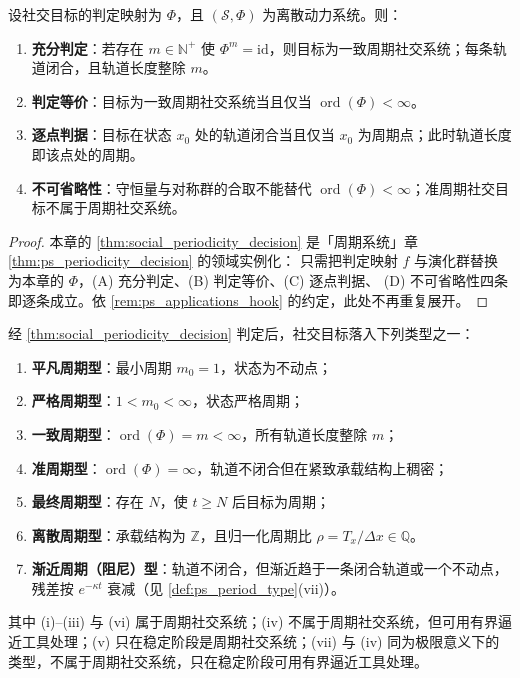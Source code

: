 \begin{theorem}[社交周期性判定定理]\label{thm:social_periodicity_decision}
设社交目标的判定映射为 $\Phi$，且 $(\mathcal S,\Phi)$ 为离散动力系统。则：
\begin{enumerate}[label=(\Alph*)]
    \item \textbf{充分判定}：若存在 $m\in\mathbb N^+$ 使 $\Phi^m=\mathrm{id}$，则目标为一致周期社交系统；每条轨道闭合，且轨道长度整除 $m$。
    \item \textbf{判定等价}：目标为一致周期社交系统当且仅当 $\operatorname{ord}(\Phi)<\infty$。
    \item \textbf{逐点判据}：目标在状态 $x_0$ 处的轨道闭合当且仅当 $x_0$ 为周期点；此时轨道长度即该点处的周期。
    \item \textbf{不可省略性}：守恒量与对称群的合取不能替代 $\operatorname{ord}(\Phi)<\infty$；准周期社交目标不属于周期社交系统。
\end{enumerate}
\end{theorem}

\begin{proof}
本章的 \cref{thm:social_periodicity_decision} 是「周期系统」章 \cref{thm:ps_periodicity_decision} 的领域实例化：
只需把判定映射 $f$ 与演化群替换为本章的 $\Phi$，(A) 充分判定、(B) 判定等价、(C) 逐点判据、
(D) 不可省略性四条即逐条成立。依 \cref{rem:ps_applications_hook} 的约定，此处不再重复展开。
\end{proof}

\begin{corollary}[社交周期类型]\label{cor:social_period_type}
经 \cref{thm:social_periodicity_decision} 判定后，社交目标落入下列类型之一：
\begin{enumerate}[label=(\roman*)]
    \item \textbf{平凡周期型}：最小周期 $m_0=1$，状态为不动点；
    \item \textbf{严格周期型}：$1<m_0<\infty$，状态严格周期；
    \item \textbf{一致周期型}：$\operatorname{ord}(\Phi)=m<\infty$，所有轨道长度整除 $m$；
    \item \textbf{准周期型}：$\operatorname{ord}(\Phi)=\infty$，轨道不闭合但在紧致承载结构上稠密；
    \item \textbf{最终周期型}：存在 $N$，使 $t\ge N$ 后目标为周期；
    \item \textbf{离散周期型}：承载结构为 $\mathbb Z$，且归一化周期比 $\rho=T_x/\Delta x\in\mathbb Q$。
    \item \textbf{渐近周期（阻尼）型}：轨道不闭合，但渐近趋于一条闭合轨道或一个不动点，残差按 $e^{-\kappa t}$ 衰减（见 \cref{def:ps_period_type}(vii)）。
\end{enumerate}
其中 (i)--(iii) 与 (vi) 属于周期社交系统；(iv) 不属于周期社交系统，但可用有界逼近工具处理；(v) 只在稳定阶段是周期社交系统；(vii) 与 (iv) 同为极限意义下的类型，不属于周期社交系统，只在稳定阶段可用有界逼近工具处理。
\end{corollary}

